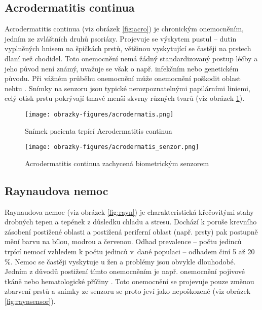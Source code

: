 \subsection{Acrodermatitis continua}
Acrodermatitis continua (viz obrázek \ref{fig:acro}) je chronickým onemocněním, jedním ze zvláštních druhů psoriázy. Projevuje se výskytem pustul -- dutin vyplněných hnisem na špičkách prstů, většinou vyskytující se častěji na prstech dlaní než chodidel. Toto onemocnění nemá žádný standardizovaný postup léčby a jeho původ není známý, uvažuje se však o např. infekčním nebo genetickém původu. Při vážném průběhu onemocnění může onemocnění poškodit oblast nehtu \cite{AcrodermatitisContinua}. Snímky na senzoru jsou typické nerozpoznatelnými papilárními liniemi, celý otisk prstu pokrývají tmavé menší skvrny různých tvarů (viz obrázek \ref{fig:acrosensor}).

\begin{figure}[!htbp]
  \begin{minipage}[b]{0.5\linewidth}
    \centering
    \texttt{[image: obrazky-figures/acrodermatis.png]}
    \caption{Snímek pacienta trpící Acrodermatitis continua \cite{AcrodermatitisContinua}}
    \label{fig:acro}
  \end{minipage}
  \hspace{0.5cm}
  \begin{minipage}[b]{0.5\linewidth}
    \centering
    \texttt{[image: obrazky-figures/acrodermatis\_senzor.png]}
    \caption{Acrodermatitis continua zachycená biometrickým senzorem \cite{Barotova}}
      \label{fig:acrosensor}
  \end{minipage}
\end{figure}

\subsection{Raynaudova nemoc}
Raynaudova nemoc (viz obrázek \ref{fig:rayn}) je charakteristická křečovitými stahy drobných tepen a tepének z důsledku chladu a stresu. Dochází k poruše krevního zásobení postižené oblasti a postižená periferní oblast (např. prsty) pak postupně mění barvu na bílou, modrou a červenou. Odhad prevalence -- počtu jedinců trpící nemocí vzhledem k počtu jedinců v~dané populaci -- odhadem činí 5 až 20 \%. Nemoc se častěji vyskytuje u žen a problémy jsou obvykle dlouhodobé. Jedním z důvodů postižení tímto onemocněním je např. onemocnění pojivové tkáně nebo hematologické příčiny \cite{InfluenceSkinDiseases}. Toto onemocnění se projevuje pouze změnou zbarvení prstů a snímky ze senzoru se proto jeví jako nepoškozené (viz obrázek \ref{fig:raynsensor}).

